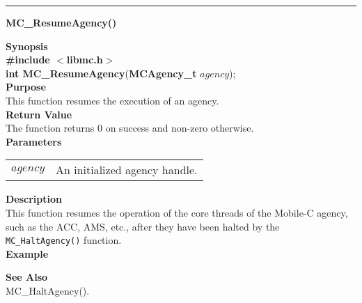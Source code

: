 \noindent
\vspace{5pt}
\rule{6.5in}{0.015in}
\noindent
{}
{\LARGE \bf MC\_ResumeAgency()}\\
\label{api:MC_ResumeAgency()}

\noindent
{\bf Synopsis}\\
{\bf \#include $<$libmc.h$>$}\\
{\bf int MC\_ResumeAgency}({\bf MCAgency\_t} $agency$);\\

\noindent
{\bf Purpose}\\
This function resumes the execution of an agency. \\

\noindent
{\bf Return Value}\\
The function returns 0 on success and non-zero otherwise.\\

\noindent
{\bf Parameters}
\vspace{-0.1in}
\begin{description}
\item
\begin{tabular}{p{10 mm}p{145 mm}} 
$agency$ & An initialized agency handle. 
\end{tabular}
\end{description}

\noindent
{\bf Description}\\
This function resumes the operation of the core threads of the Mobile-C
agency, such as the ACC, AMS, etc., after they have been halted by the 
\texttt{MC\_HaltAgency()} function.\\

\noindent
{\bf Example}\\
\noindent

\noindent
{\bf See Also}\\
MC\_HaltAgency().

